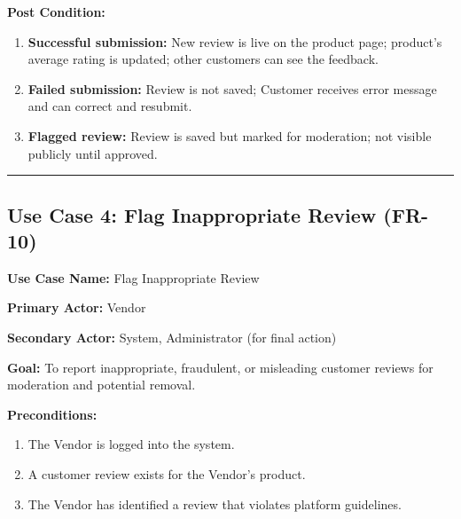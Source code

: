 \textbf{Post Condition:}
\begin{enumerate}
    \item \textbf{Successful submission:} New review is live on the product page; product's average rating is updated; other customers can see the feedback.
    \item \textbf{Failed submission:} Review is not saved; Customer receives error message and can correct and resubmit.
    \item \textbf{Flagged review:} Review is saved but marked for moderation; not visible publicly until approved.
\end{enumerate}

\vspace{0.5cm}
\hrule
\vspace{0.5cm}

\subsection*{Use Case 4: Flag Inappropriate Review (FR-10)}

\textbf{Use Case Name:} Flag Inappropriate Review

\textbf{Primary Actor:} Vendor

\textbf{Secondary Actor:} System, Administrator (for final action)

\textbf{Goal:} To report inappropriate, fraudulent, or misleading customer reviews for moderation and potential removal.

\textbf{Preconditions:}
\begin{enumerate}
    \item The Vendor is logged into the system.
    \item A customer review exists for the Vendor's product.
    \item The Vendor has identified a review that violates platform guidelines.
\end{enumerate}

